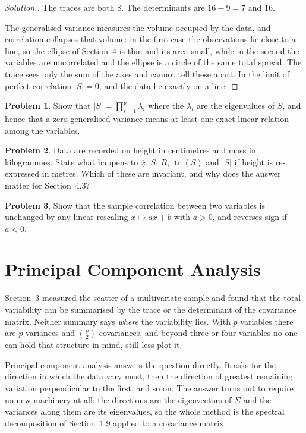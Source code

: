 \documentclass[11pt,a4paper]{article}
\theoremstyle{definition}
\newtheorem{problemx}{Problem}[section]
\newenvironment{problem}{\begin{problemx}}{\end{problemx}}
\newenvironment{solution}
  {\renewcommand{\qedsymbol}{}\begin{proof}[\textit{Solution}.]}
  {\end{proof}}
\begin{document}
\begin{solution}
The traces are both $8$. The determinants are $16-9=7$ and $16$.

The generalised variance measures the volume occupied by the data, and
correlation collapses that volume: in the first case the observations lie close
to a line, so the ellipse of Section~4 is thin and its area small, while in the
second the variables are uncorrelated and the ellipse is a circle of the same
total spread. The trace sees only the sum of the axes and cannot tell these
apart. In the limit of perfect correlation $|S|=0$, and the data lie exactly on
a line.
\end{solution}

\begin{problem}
Show that $\left|S\right| = \prod^{p}_{i=1}\lambda_i$ where the $\lambda_i$ are
the eigenvalues of $S$, and hence that a zero generalised variance means at
least one exact linear relation among the variables.
\end{problem}

\begin{problem}
Data are recorded on height in centimetres and mass in kilogrammes. State what
happens to $\overline{\underline{x}}$, $S$, $R$, $\operatorname{tr}(S)$ and
$\left|S\right|$ if height is re-expressed in metres. Which of these are
invariant, and why does the answer matter for Section~4.3?
\end{problem}

\begin{problem}
Show that the sample correlation between two variables is unchanged by any
linear rescaling $x\mapsto ax+b$ with $a>0$, and reverses sign if $a<0$.
\end{problem}

\section{Principal Component Analysis}

Section~3 measured the scatter of a multivariate sample and found that the
total variability can be summarised by the trace or the determinant of the
covariance matrix. Neither summary says \emph{where} the variability lies. With
$p$ variables there are $p$ variances and $\binom{p}{2}$ covariances, and beyond
three or four variables no one can hold that structure in mind, still less plot
it.

Principal component analysis answers the question directly. It asks for the
direction in which the data vary most, then the direction of greatest remaining
variation perpendicular to the first, and so on. The answer turns out to require
no new machinery at all: the directions are the eigenvectors of $\Sigma$ and the
variances along them are its eigenvalues, so the whole method is the spectral
decomposition of Section~1.9 applied to a covariance matrix.
\end{document}

